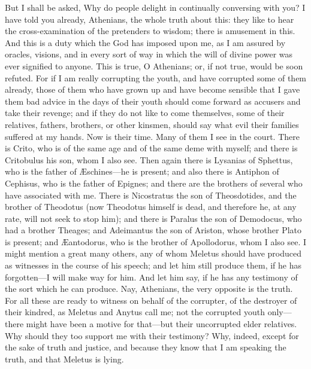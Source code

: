 \documentclass[12pt]{article}
\begin{document}
But I shall be asked, Why do people delight in continually conversing
with you? I have told you already, Athenians, the whole truth about
this: they like to hear the cross-examination of the pretenders to
wisdom; there is amusement in this. And this is a duty which the God
has imposed upon me, as I am assured by oracles, visions, and in every
sort of way in which the will of divine power was ever signified to
anyone. This is true, O Athenians; or, if not true, would be soon
refuted. For if I am really corrupting the youth, and have corrupted
some of them already, those of them who have grown up and have become
sensible that I gave them bad advice in the days of their youth should
come forward as accusers and take their revenge; and if they do not
like to come themselves, some of their relatives, fathers, brothers,
or other kinsmen, should say what evil their families suffered at
my hands. Now is their time. Many of them I see in the court. There
is Crito, who is of the same age and of the same deme with myself;
and there is Critobulus his son, whom I also see. Then again there
is Lysanias of Sphettus, who is the father of {\AE}schines---he is present;
and also there is Antiphon of Cephisus, who is the father of Epignes;
and there are the brothers of several who have associated with me.
There is Nicostratus the son of Theosdotides, and the brother of Theodotus
(now Theodotus himself is dead, and therefore he, at any rate, will
not seek to stop him); and there is Paralus the son of Demodocus,
who had a brother Theages; and Adeimantus the son of Ariston, whose
brother Plato is present; and {\AE}antodorus, who is the brother of Apollodorus,
whom I also see. I might mention a great many others, any of whom
Meletus should have produced as witnesses in the course of his speech;
and let him still produce them, if he has forgotten---I will make
way for him. And let him say, if he has any testimony of the sort
which he can produce. Nay, Athenians, the very opposite is the truth.
For all these are ready to witness on behalf of the corrupter, of
the destroyer of their kindred, as Meletus and Anytus call me; not
the corrupted youth only---there might have been a motive for that---but their
uncorrupted elder relatives. Why should they too support me with their
testimony? Why, indeed, except for the sake of truth
and justice, and because they know that I am speaking the truth, and
that Meletus is lying.
\end{document}
